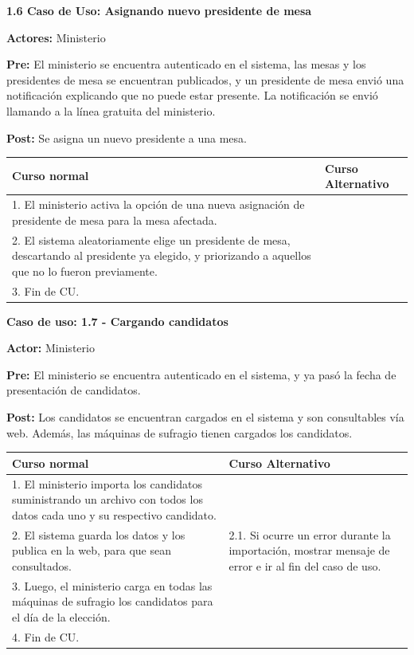 \textbf{1.6 Caso de Uso: Asignando nuevo presidente de mesa}

\textbf{Actores:} Ministerio 

\textbf{Pre:} El ministerio se encuentra autenticado en el sistema, las mesas y los presidentes de mesa se encuentran publicados, y un presidente de mesa envió una notificación explicando que no puede estar presente. La notificación se envió llamando a la línea gratuita del ministerio.

\textbf{Post:} Se asigna un nuevo presidente a una mesa.

\newpage

\begin{table}[h!]
	
 \begin{tabular}{|p{7.5cm} | p{7.5cm}|} 
 \hline
 \textbf{Curso normal} & \textbf{Curso Alternativo} \\
 \hline

1. El ministerio activa la opción de una nueva asignación de presidente de mesa para la mesa afectada. & \\
\hline

2.  El sistema aleatoriamente elige un presidente de mesa, descartando al presidente ya elegido, y priorizando a aquellos que no lo fueron previamente. & \\
\hline


3. Fin de CU. & \\
\hline



 \end{tabular}

\end{table}

\textbf{Caso de uso: 1.7 - Cargando candidatos}

\textbf{Actor:} Ministerio

\textbf{Pre:} El ministerio se encuentra autenticado en el sistema, y ya pasó la fecha de presentación de candidatos.

\textbf{Post:} Los candidatos se encuentran cargados en el sistema y son consultables vía web. Además, las máquinas de sufragio tienen cargados los candidatos.
\begin{table}[h!]
	
 \begin{tabular}{|p{7.5cm} | p{7.5cm}|} 
 \hline
 \textbf{Curso normal} & \textbf{Curso Alternativo} \\
 \hline
1. El ministerio importa los candidatos suministrando un archivo con todos los datos cada uno y su respectivo candidato. & \\
\hline

2. El sistema guarda los datos y los publica en la web, para que sean consultados. &
2.1. Si ocurre un error durante la importación, mostrar mensaje de error e ir al fin del caso de uso. \\
\hline
3. Luego, el ministerio carga en todas las máquinas de sufragio los candidatos para el día de la elección. & \\
\hline

4. Fin de CU. & \\
\hline
\end{tabular}
\end{table}

